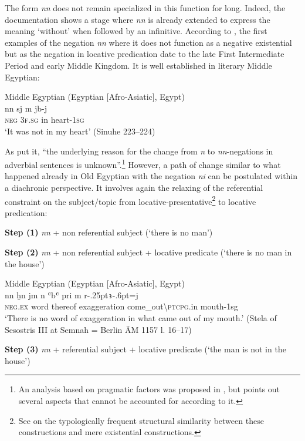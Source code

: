 \documentclass[output=paper]{langsci/langscibook}
\newcommand{\ꜥ}{ʿ}
\newcommand{\ꜣ}{\kern-.25pt\texttt{ꜣ}\kern-.6pt}
\begin{document}
The form \textit{nn} does not remain specialized in this function for long. Indeed, the documentation shows a stage where \textit{nn} is already extended to express the meaning ‘without’ when followed by an infinitive. According to \citet[256–257]{Loprieno-etal2017}, the first examples of the negation \textit{nn} where it does not function as a negative existential but as the negation in locative predication date to the late First Intermediate Period and early Middle Kingdom. It is well established in literary Middle Egyptian: 

\ea Middle Egyptian (Egyptian [Afro-Asiatic], Egypt) \label{ex:AE30}\\
    \gll nn sj m jb-j\\ 
    \textsc{neg} \textsc{3f.sg} in heart-\textsc{1sg}\\ 
    \glt ‘It was not in my heart’ (Sinuhe 223–224) 
\z 

As \citet{Loprieno-etal2017} put it, ``the underlying reason for the change from \textit{n} to \textit{nn}-negations in adverbial sentences is unknown''.\footnote{An analysis based on pragmatic factors was proposed in \citet{Loprieno1991}, but \citet{Uljas2013} points out several aspects that cannot be accounted for according to it.} However, a path of change
similar to what happened already in Old Egyptian with the negation \textit{ni} can be postulated within a diachronic perspective. It involves again the relaxing of the referential constraint on the subject/topic from locative-presentative\footnote{See \citet[108]{Veselinova2013} on the typologically frequent structural similarity between these constructions and mere existential constructions.} to locative predication:  


\textbf{Step (1)} \textit{nn} + non referential subject (‘there is no man’) 
 
\textbf{Step (2)} \textit{nn} + non referential subject + locative predicate (‘there is no man in the house’) 


\ea Middle Egyptian (Egyptian [Afro-Asiatic], Egypt) \label{ex:AE31}\\
    \gll nn ḫn jm n {\ꜥ}b{\ꜥ} pri m r{\ꜣ}=j\\
    \textsc{neg.ex} word thereof exaggeration come\_out\textbackslash\textsc{ptcpg}.in mouth-1sg\\ 
    \glt ‘There is no word of exaggeration in what came out of my mouth.’ (Stela of Sesostris III at Semnah = Berlin ÄM 1157 l. 16–17)
\z 

\textbf{Step (3)} \textit{nn} + referential subject + locative predicate (‘the man is not in the house’) 
 
\end{document}
